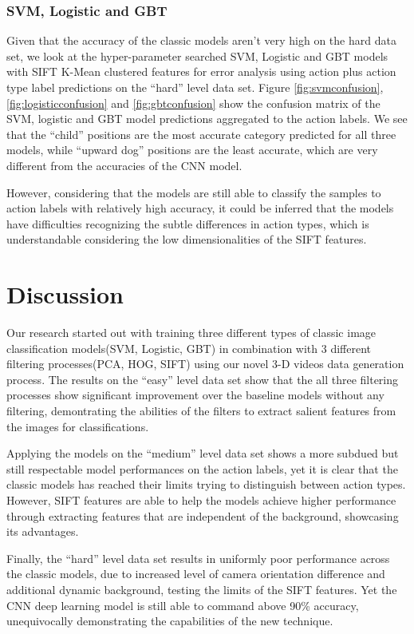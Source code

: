 \documentclass[
	a4paper, %
	10pt, %
	unnumberedsections, %
	twoside, %
]{t0004}
\begin{document}
\subsubsection{SVM, Logistic and GBT} Given that the accuracy of the classic models aren't very high on the hard data set, we look at the hyper-parameter searched SVM, Logistic and GBT models with SIFT K-Mean clustered features for error analysis using action plus action type label predictions on the ``hard'' level data set. Figure \ref{fig:svmconfusion},  \ref{fig:logisticconfusion} and \ref{fig:gbtconfusion}  show the confusion matrix of the SVM, logistic and GBT model predictions aggregated to the action labels. We see that the ``child'' positions are the most accurate category predicted for all three models, while ``upward dog'' positions are the least accurate, which are very different from the accuracies of the CNN model.

However, considering that the models are still able to classify the samples to action labels with relatively high accuracy, it could be inferred that the models have difficulties recognizing the subtle differences in action types, which is understandable considering the low dimensionalities of the SIFT features.

\section{Discussion}

Our research started out with training three different types of classic image classification models(SVM, Logistic, GBT) in combination with 3 different filtering processes(PCA, HOG, SIFT) using our novel 3-D videos data generation process. The results on the ``easy'' level data set show that the all three filtering processes show significant improvement over the baseline models without any filtering, demontrating the abilities of the filters to extract salient features from the images for classifications.

Applying the models on the ``medium'' level data set shows a more subdued but still respectable model performances on the action labels, yet  it is clear that the classic models has reached their limits trying to distinguish between action types. However, SIFT features are able to help the models achieve higher performance through extracting features that are independent of the background, showcasing its advantages.

Finally, the ``hard'' level data set results in uniformly poor performance across the classic models, due to increased level of camera orientation difference and additional dynamic background, testing the limits of the SIFT features. Yet the CNN deep learning model is still able to command above 90\% accuracy, unequivocally demonstrating the capabilities of the new technique.
\end{document}
